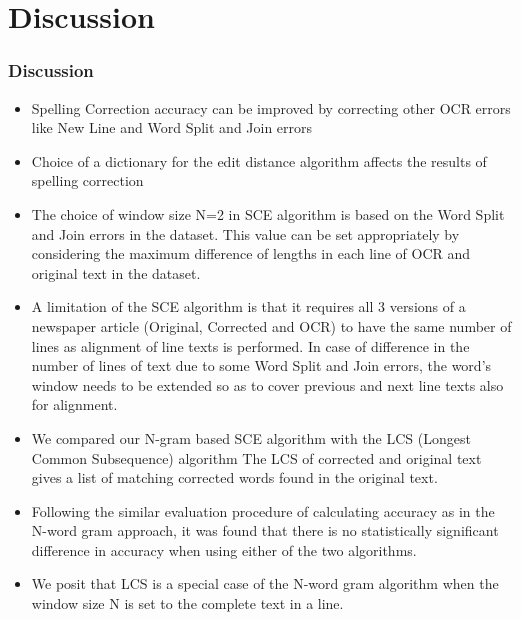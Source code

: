 \documentclass{beamer}
\begin{document}
\section{Discussion}

\begin{frame}[allowframebreaks]
\frametitle{Discussion}
\begin{itemize}
 \justifying

\item
Spelling Correction accuracy can be improved by correcting other OCR errors like New Line and Word Split and Join errors
\item
 Choice of a dictionary for the edit distance algorithm affects the results of spelling correction 
\item
The choice of window size N=2 in SCE algorithm is based on the Word Split and Join errors in the dataset. This value can be set appropriately
by considering the maximum difference of lengths in each line of OCR and original text in the dataset.
\item
A limitation of the SCE algorithm is that it requires all 3 versions of a newspaper article (Original, Corrected and
OCR) to have the same number of lines as alignment of line texts is performed. In case of difference in the number of
lines of text due to some Word Split and Join errors, the word’s window needs to be extended so as to cover previous
and next line texts also for alignment.

\item
We compared our N-gram based SCE algorithm with the LCS (Longest Common Subsequence) algorithm
The LCS of corrected and original text gives a list of matching corrected words found in the original text.
\item
Following the similar evaluation procedure of calculating accuracy as in the N-word gram approach, it was found that
there is no statistically significant difference in accuracy when using either of the two algorithms.
\item
 We posit that LCS is a special case of the N-word gram algorithm when the window size N is set to the complete text in a line.
\end{itemize}
\end{frame}
\end{document}
